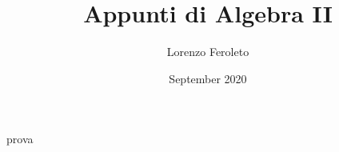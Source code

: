 \documentclass{article}
\title{Appunti di Algebra II}
\author{Lorenzo Feroleto}
\date{September 2020}
\begin{document}
prova
\end{document}
